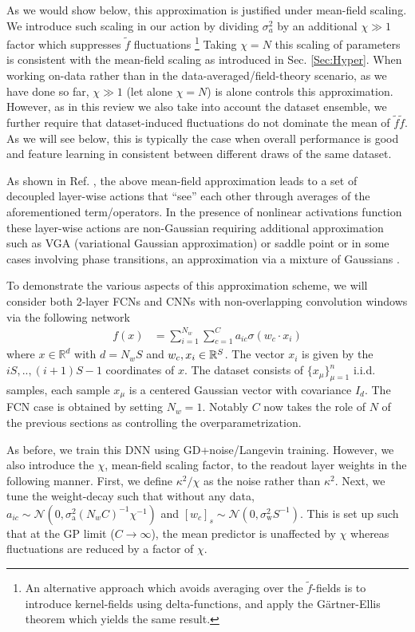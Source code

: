 As we would show below, this approximation is justified under mean-field scaling. We introduce such scaling in our action by dividing $\sigma_a^2$ by an additional $\chi \gg 1$ factor which suppresses $\tilde{f}$ fluctuations \footnote{An alternative approach which avoids averaging over the $\tilde{f}$-fields is to introduce kernel-fields using delta-functions, and apply the Gärtner-Ellis theorem \cite{fischer2024critical} which yields the same result.} Taking $\chi=N$ this scaling of parameters is consistent with the mean-field scaling as introduced in Sec. \ref{Sec:Hyper}. When working on-data rather than in the data-averaged/field-theory scenario, as we have done so far, $\chi \gg 1$ (let alone $\chi=N$) is alone controls this approximation. However, as in this review we also take into account the dataset ensemble, we further require that dataset-induced fluctuations do not dominate the mean of $\tilde{f} \tilde{f}$. As we will see below, this is typically the case when overall performance is good and feature learning in consistent between different draws of the same dataset. 

As shown in Ref. \cite{seroussi2023separation}, the above mean-field approximation leads to a set of decoupled layer-wise actions that ``see'' each other through averages of the aforementioned term/operators. In the presence of nonlinear activations function these layer-wise  actions are non-Gaussian requiring additional approximation such as VGA (variational Gaussian approximation) or saddle point or in some cases involving phase transitions, an approximation via a mixture of Gaussians \cite{rubin2024grokking}. 

To demonstrate the various aspects of this approximation scheme, we will consider both 2-layer FCNs and CNNs with non-overlapping convolution windows via the following network 
\begin{align} \label{Eq:2_layer_FCN}
    f({x}) &= \sum_{i=1}^{N_w} \sum_{c=1}^{C} a_{ic} \sigma\left({w}_c \cdot {x}_{i}\right) 
\end{align}
where ${x} \in {\mathbb{R}}^{d}$ with $d = N_w S$ and ${w}_c, {x}_{i} \in {\mathbb{R}}^{S}$. The vector ${x}_{i}$ is given by the $iS,..,(i+1)S-1$ coordinates of ${x}$. 
The dataset consists of $\{ {x}_{\mu} \}_{\mu=1}^{n}$ i.i.d. samples, each sample ${x}_\mu$ is a centered Gaussian vector with covariance $I_d$. The FCN case is obtained by setting $N_w=1$. Notably $C$ now takes the role of $N$ of the previous sections as controlling the overparametrization.   

As before, we train this DNN using GD+noise/Langevin training. However, we also introduce the $\chi$, mean-field scaling factor, to the readout layer weights in the following manner. First, we define $\kappa^2/\chi$ as the noise rather than $\kappa^2$. Next, we tune the weight-decay such that without any data, $a_{ic} \sim {\mathcal N}(0,\sigma_\text{a}^{2}(N_w C)^{-1} \chi^{-1})$ and $[{w}_c]_s \sim {\mathcal N}(0,\sigma_\text{w}^2 S^{-1})$. This is set up such that at the GP limit ($C \rightarrow \infty$), the mean predictor is unaffected by $\chi$ whereas fluctuations are reduced by a factor of $\chi$. 


